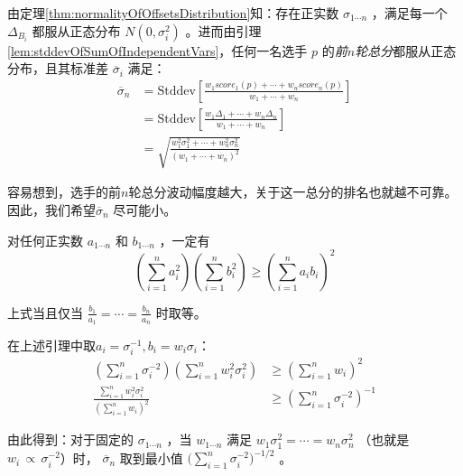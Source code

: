         \vspace{1.5ex}

        由定理\ref{thm:normalityOfOffsetsDistribution}知：存在正实数 $\sigma_{1\cdots n}$ ，满足每一个 $\Delta_{B_i}$ 都服从正态分布 $N(0,\sigma_i^2)$ 。进而由引理\ref{lem:stddevOfSumOfIndependentVars}，任何一名选手 $p$ 的\emph{前$n$轮总分}都服从正态分布，且其标准差 $\overline{\sigma}_i$ 满足：
        \begin{align*}
            \overline{\sigma}_n
            &=\mathrm{Stddev}\left[\frac{w_1\textit{score}_1(p)+\cdots+w_n\textit{score}_n(p)}{w_1+\cdots+w_n}\right] \\
            &=\mathrm{Stddev}\left[\frac{w_1\Delta_1+\cdots+w_n\Delta_n}{w_1+\cdots+w_n}\right] \\
            &=\sqrt{\frac{w_1^2\sigma_1^2+\cdots+w_n^2\sigma_n^2}{\left(w_1+\cdots+w_n\right)^2}}
        \end{align*}

        容易想到，选手的前$n$轮总分波动幅度越大，关于这一总分的排名也就越不可靠。因此，我们希望$\overline{\sigma}_n$ 尽可能小。

        \begin{lemma}[柯西不等式]
            对任何正实数 $a_{1\cdots n}$ 和 $b_{1\cdots n}$ ，一定有
            $$
            \left(\sum\limits_{i=1}^n a_i^2\right)\left(\sum\limits_{i=1}^n b_i^2\right)
            \geq\left(\sum\limits_{i=1}^n a_ib_i\right)^2
            $$

            上式当且仅当 $\frac{b_1}{a_1}=\cdots=\frac{b_n}{a_n}$ 时取等。

            \label{lem:Cauchy}
        \end{lemma}

        在上述引理中取$a_i=\sigma_i^{-1},b_i=w_i\sigma_i$：
        \begin{align*}
            \left(\sum\limits_{i=1}^n \sigma_i^{-2}\right)\left(\sum\limits_{i=1}^n w_i^2\sigma_i^2\right)&\geq\left(\sum\limits_{i=1}^n w_i\right)^2 \\
            \frac{\sum\limits_{i=1}^n w_i^2\sigma_i^2}{\left(\sum\limits_{i=1}^n w_i\right)^2}&\geq\left(\sum\limits_{i=1}^n \sigma_i^{-2}\right)^{-1}
        \end{align*}

        由此得到：对于固定的 $\sigma_{1\cdots n}$ ，当 $w_{1\cdots n}$ 满足 $w_1\sigma_1^2=\cdots=w_n\sigma_n^2$ （也就是$w_i\,\propto\, \sigma_i^{-2}$）时， $\overline{\sigma}_n$ 取到最小值 $\big(\sum_{i=1}^n \sigma_i^{-2}\big)^{-1/2}$ 。
        
